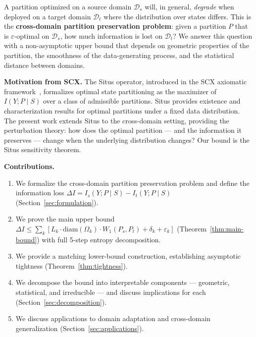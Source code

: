 \documentclass[12pt,a4paper]{article}
\newcommand{\cD}{\mathcal{D}}
\newcommand{\Wass}{W_1}
\newcommand{\diam}{\mathrm{diam}}
\begin{document}
A partition optimized on a source domain $\cD_s$ will, in general,
\emph{degrade} when deployed on a target domain $\cD_t$ where the
distribution over states differs.  This is the \textbf{cross-domain
partition preservation problem}: given a partition $P$ that is
$\varepsilon$-optimal on $\cD_s$, how much information is lost on
$\cD_t$?  We answer this question with a non-asymptotic upper bound that
depends on geometric properties of the partition, the smoothness of the
data-generating process, and the statistical distance between domains.

\medskip\noindent
\textbf{Motivation from SCX.}
The Situs operator, introduced in the \textsf{SCX} axiomatic
framework~\citep{scx2024situs}, formalizes optimal state partitioning as
the maximizer of $I(Y;P\mid S)$ over a class of admissible partitions.
Situs provides existence and characterization results for optimal
partitions under a fixed data distribution.  The present work extends
Situs to the cross-domain setting, providing the perturbation theory:
how does the optimal partition --- and the information it preserves ---
change when the underlying distribution changes?  Our bound is the
Situs sensitivity theorem.

\medskip\noindent
\textbf{Contributions.}
\begin{enumerate}[label=(\arabic*)]
    \item We formalize the cross-domain partition preservation problem and
          define the information loss $\Delta I = I_s(Y;P\mid S) -
          I_t(Y;P\mid S)$ (Section~\ref{sec:formulation}).
    \item We prove the main upper bound
          $\Delta I \leq \sum_{k}[L_k\cdot\diam(\Omega_k)\cdot\Wass(P_s,P_t)
          + \delta_k + \varepsilon_k]$
          (Theorem~\ref{thm:main-bound}) with full 5-step entropy decomposition.
    \item We provide a matching lower-bound construction, establishing
          asymptotic tightness (Theorem~\ref{thm:tightness}).
    \item We decompose the bound into interpretable components --- geometric,
          statistical, and irreducible --- and discuss implications for
          each (Section~\ref{sec:decomposition}).
    \item We discuss applications to domain adaptation and cross-domain
          generalization (Section~\ref{sec:applications}).
\end{enumerate}

\end{document}
